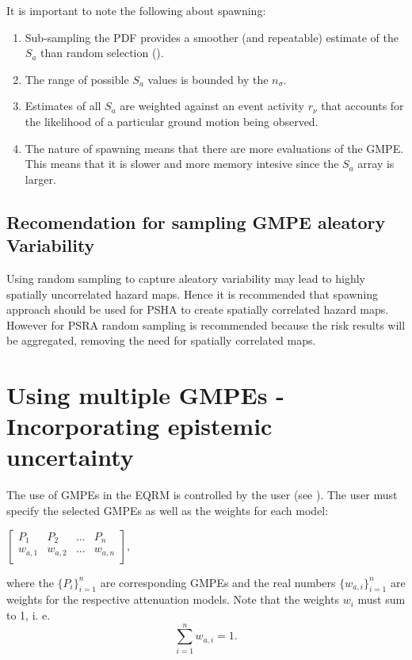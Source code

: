 It is important to note the following about spawning:
\begin{enumerate}
\item Sub-sampling the PDF provides a smoother (and repeatable)
estimate of the $S_a$ than random selection
(). \item The range of possible $S_a$
values is bounded by the $n_\sigma$. \item Estimates of all $S_a$
are weighted against an event activity $r_\nu$ that accounts for the
likelihood of a particular ground motion being observed. \item The
nature of spawning means that there are more evaluations of the
GMPE. This means that it is slower and more memory intesive since
the $S_a$ array is larger.
\end{enumerate}




\subsection{Recomendation for sampling GMPE aleatory Variability}

Using random sampling to capture aleatory variability may lead to
highly spatially uncorrelated hazard maps. Hence it is recommended
that spawning approach should be used for PSHA to create spatially
correlated hazard maps. However for PSRA random sampling is
recommended because the risk results will be aggregated, removing
the need for spatially correlated maps.
\section{Using multiple GMPEs - Incorporating epistemic uncertainty}
\label{sec:attn-multi-attnmodels}

The use of GMPEs in the EQRM is controlled by the user (see
). The user must specify the
selected GMPEs as well as the weights for each model:
\begin{center}
\begin{math}
 \left[ \begin{array}{ccccc}
P_1 & P_2 &  \hdots & P_n \\
w_{a,1} & w_{a,2} &  \hdots & w_{a,n} \\
\end{array} \right],
\end{math}
\end{center}
where the $\{P_i\}_{i=1}^n$ are corresponding GMPEs and the real
numbers $\{w_{a,i}\}_{i=1}^n$ are weights for the respective
attenuation models. Note that the weights $w_i$ must sum to 1, i. e.
\begin{equation}
\sum_{i=1}^{n}w_{a,i} = 1.
\end{equation}



